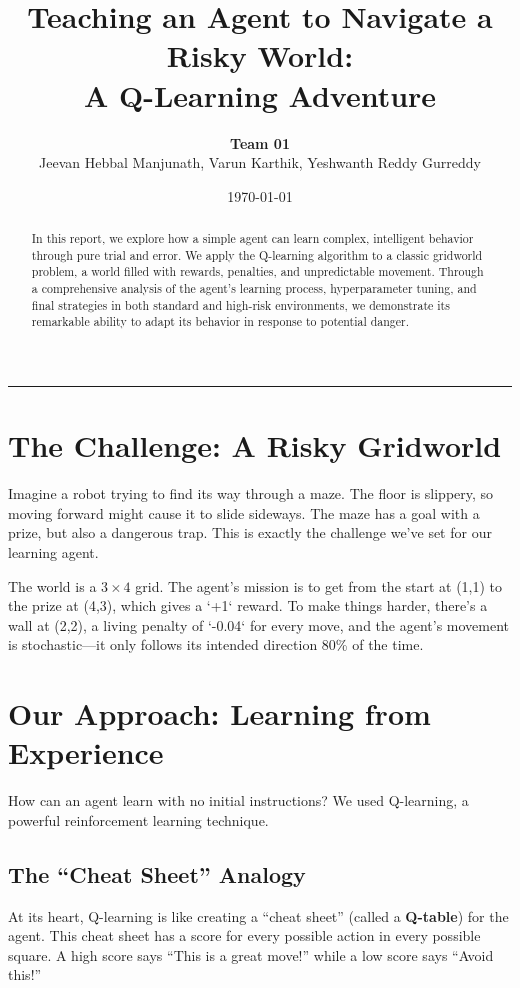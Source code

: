 \documentclass[11pt, a4paper]{article}
\title{\textbf{Teaching an Agent to Navigate a Risky World: \\ A Q-Learning Adventure}}
\author{\Large\textbf{Team 01}  \\Jeevan Hebbal Manjunath, Varun Karthik, Yeshwanth Reddy Gurreddy}
\date{\today}
\begin{document}
\maketitle

\begin{abstract}
In this report, we explore how a simple agent can learn complex, intelligent behavior through pure trial and error. We apply the Q-learning algorithm to a classic gridworld problem, a world filled with rewards, penalties, and unpredictable movement. Through a comprehensive analysis of the agent's learning process, hyperparameter tuning, and final strategies in both standard and high-risk environments, we demonstrate its remarkable ability to adapt its behavior in response to potential danger.
\end{abstract}

\hrule
\vspace{1em}

\section{The Challenge: A Risky Gridworld}
Imagine a robot trying to find its way through a maze. The floor is slippery, so moving forward might cause it to slide sideways. The maze has a goal with a prize, but also a dangerous trap. This is exactly the challenge we've set for our learning agent.

The world is a $3 \times 4$ grid. The agent's mission is to get from the start at (1,1) to the prize at (4,3), which gives a `+1` reward. To make things harder, there's a wall at (2,2), a living penalty of `-0.04` for every move, and the agent's movement is stochastic—it only follows its intended direction 80\% of the time.

\section{Our Approach: Learning from Experience}
How can an agent learn with no initial instructions? We used Q-learning, a powerful reinforcement learning technique.

\subsection{The ``Cheat Sheet'' Analogy}
At its heart, Q-learning is like creating a ``cheat sheet'' (called a \textbf{Q-table}) for the agent. This cheat sheet has a score for every possible action in every possible square. A high score says ``This is a great move!'' while a low score says ``Avoid this!''
\end{document}
